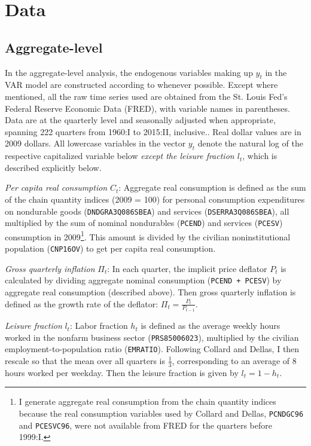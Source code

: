 \section{Data}

\subsection{Aggregate-level}
\label{aggregate-data}

In the aggregate-level analysis, the endogenous variables making up $y_t$ in the VAR model are constructed according to \cite{collard11} whenever possible. Except where mentioned, all the raw time series used are obtained from the St. Louis Fed's Federal Reserve Economic Data (FRED), with variable names in parentheses. Data are at the quarterly level and seasonally adjusted when appropriate, spanning 222 quarters from 1960:I to 2015:II, inclusive.. Real dollar values are in 2009 dollars. All lowercase variables in the vector $y_t$ denote the natural log of the respective capitalized variable below \textit{except the leisure fraction $l_t$}, which is described explicitly below.

\textit{Per capita real consumption} $C_t$: Aggregate real consumption is defined as the sum of the chain quantity indices (2009 = 100) for personal consumption expenditures on nondurable goods (\texttt{DNDGRA3Q086SBEA}) and services (\texttt{DSERRA3Q086SBEA}), all multiplied by the sum of nominal nondurables (\texttt{PCEND}) and services (\texttt{PCESV}) consumption in 2009\footnote{I generate aggregate real consumption from the chain quantity indices because the real consumption variables used by Collard and Dellas, \texttt{PCNDGC96} and \texttt{PCESVC96}, were not available from FRED for the quarters before 1999:I.}. This amount is divided by the civilian noninstitutional population (\texttt{CNP16OV}) to get per capita real consumption.

\textit{Gross quarterly inflation} $\Pi_t$: In each quarter, the implicit price deflator $P_t$ is calculated by dividing aggregate nominal consumption (\texttt{PCEND + PCESV}) by aggregate real consumption (described above). Then gross quarterly inflation is defined as the growth rate of the deflator: $\Pi_t = \frac{P_t}{P_{t-1}}$.

\textit{Leisure fraction} $l_t$: Labor fraction $h_t$ is defined as the average weekly hours worked in the nonfarm business sector (\texttt{PRS85006023}), multiplied by the civilian employment-to-population ratio (\texttt{EMRATIO}). Following Collard and Dellas, I then rescale so that the mean over all quarters is $\frac{1}{3}$, corresponding to an average of 8 hours worked per weekday. Then the leisure fraction is given by $l_t = 1 - h_t$.

